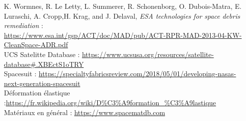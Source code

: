 \documentclass[a4paper,1pt]{article}
\begin{document}
\begin{thebibliography}{11}
	K. Wormnes, R. Le Letty, L. Summerer, R. Schonenborg, O. Dubois-Matra, E. Luraschi, A. Cropp,H. Krag, and J. Delaval, \textit{ESA technologies for space debris remediation} :\\
	\url{https://www.esa.int/gsp/ACT/doc/MAD/pub/ACT-RPR-MAD-2013-04-KW-CleanSpace-ADR.pdf}\\
	
	UCS Satelitte Database : \url{https://www.ucsusa.org/resources/satellite-database#.XBEctS1oTRY}\\

	Spacesuit : \url{https://specialtyfabricsreview.com/2018/05/01/developing-nasas-next-generation-spacesuit}\\
	
	Déformation élastique :\url{https://fr.wikipedia.org/wiki/D%C3%A9formation_%C3%A9lastique}\\

	Matériaux en général : \url{https://www.spacematdb.com}
\end{thebibliography}
\end{document}
